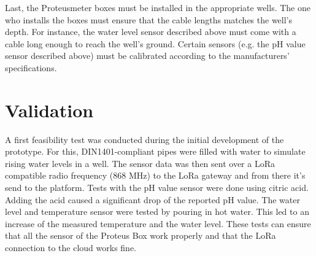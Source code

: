 \documentclass[11pt, letterpaper]{article}
\begin{document}
Last, the Proteusmeter boxes must be installed in the appropriate wells. The one who installs the boxes must ensure that the cable lengths matches the well's depth. For instance, the water level sensor described above must come with a cable long enough to reach the well's ground. Certain sensors (e.g. the pH value sensor described above) must be calibrated according to the manufacturers' specifications.


\section{Validation}
A first feasibility test was conducted during the initial development of the prototype. For this, DIN1401-compliant pipes were filled with water to simulate rising water levels in a well. The sensor data was then sent over a LoRa compatible radio frequency (868 MHz) to the LoRa gateway and from there it's send to the platform. Tests with the pH value sensor were done using citric acid. Adding the acid caused a significant drop of the reported pH value. The water level and temperature sensor were tested by pouring in hot water. This led to an increase of the measured temperature and the water level. These tests can ensure that all the sensor of the Proteus Box work properly and that the LoRa connection to the cloud works fine. 
\end{document}
